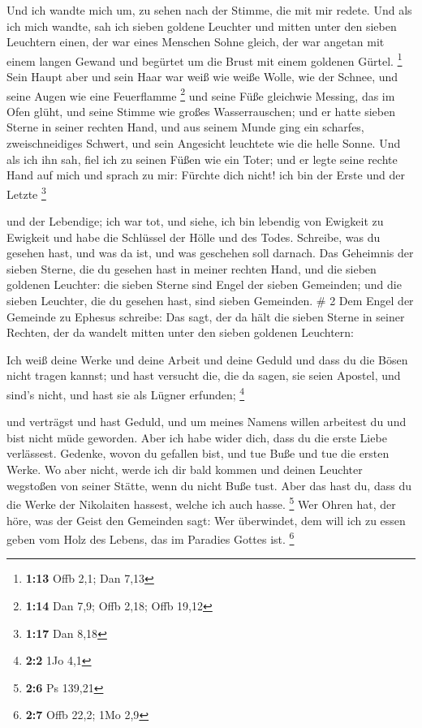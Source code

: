  Und ich wandte mich um, zu sehen nach der Stimme, die
mit mir redete. Und als ich mich wandte, sah ich sieben goldene Leuchter
 und mitten unter den sieben Leuchtern einen, der war
eines Menschen Sohne gleich, der war angetan mit einem langen Gewand und
begürtet um die Brust mit einem goldenen Gürtel. \footnote{\textbf{1:13}
  Offb 2,1; Dan 7,13}  Sein Haupt aber und sein Haar war
weiß wie weiße Wolle, wie der Schnee, und seine Augen wie eine
Feuerflamme \footnote{\textbf{1:14} Dan 7,9; Offb 2,18; Offb 19,12}
 und seine Füße gleichwie Messing, das im Ofen glüht, und
seine Stimme wie großes Wasserrauschen;  und er hatte
sieben Sterne in seiner rechten Hand, und aus seinem Munde ging ein
scharfes, zweischneidiges Schwert, und sein Angesicht leuchtete wie die
helle Sonne.  Und als ich ihn sah, fiel ich zu seinen
Füßen wie ein Toter; und er legte seine rechte Hand auf mich und sprach
zu mir: Fürchte dich nicht! ich bin der Erste und der Letzte \footnote{\textbf{1:17}
  Dan 8,18}

 und der Lebendige; ich war tot, und siehe, ich bin
lebendig von Ewigkeit zu Ewigkeit und habe die Schlüssel der Hölle und
des Todes.  Schreibe, was du gesehen hast, und was da
ist, und was geschehen soll darnach.  Das Geheimnis der
sieben Sterne, die du gesehen hast in meiner rechten Hand, und die
sieben goldenen Leuchter: die sieben Sterne sind Engel der sieben
Gemeinden; und die sieben Leuchter, die du gesehen hast, sind sieben
Gemeinden. \# 2  Dem Engel der Gemeinde zu Ephesus
schreibe: Das sagt, der da hält die sieben Sterne in seiner Rechten, der
da wandelt mitten unter den sieben goldenen Leuchtern:

 Ich weiß deine Werke und deine Arbeit und deine Geduld
und dass du die Bösen nicht tragen kannst; und hast versucht die, die da
sagen, sie seien Apostel, und sind's nicht, und hast sie als Lügner
erfunden; \footnote{\textbf{2:2} 1Jo 4,1}

 und verträgst und hast Geduld, und um meines Namens
willen arbeitest du und bist nicht müde geworden.  Aber
ich habe wider dich, dass du die erste Liebe verlässest. 
Gedenke, wovon du gefallen bist, und tue Buße und tue die ersten Werke.
Wo aber nicht, werde ich dir bald kommen und deinen Leuchter wegstoßen
von seiner Stätte, wenn du nicht Buße tust.  Aber das hast
du, dass du die Werke der Nikolaiten hassest, welche ich auch hasse.
\footnote{\textbf{2:6} Ps 139,21}  Wer Ohren hat, der
höre, was der Geist den Gemeinden sagt: Wer überwindet, dem will ich zu
essen geben vom Holz des Lebens, das im Paradies Gottes ist. \footnote{\textbf{2:7}
  Offb 22,2; 1Mo 2,9}

